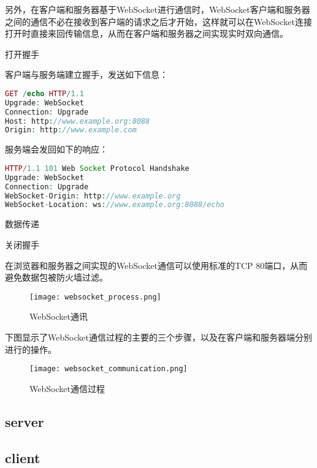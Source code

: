 另外，在客户端和服务器基于WebSocket进行通信时，WebSocket客户端和服务器之间的通信不必在接收到客户端的请求之后才开始，这样就可以在WebSocket连接打开时直接来回传输信息，从而在客户端和服务器之间实现实时双向通信。

\begin{compactenum}
\item 打开握手


客户端与服务端建立握手，发送如下信息：

\begin{lstlisting}[language=PHP]
GET /echo HTTP/1.1
Upgrade: WebSocket
Connection: Upgrade
Host: http://www.example.org:8088
Origin: http://www.example.com
\end{lstlisting}

服务端会发回如下的响应：

\begin{lstlisting}[language=PHP]
HTTP/1.1 101 Web Socket Protocol Handshake
Upgrade: WebSocket
Connection: Upgrade
WebSocket-Origin: http://www.example.org
WebSocket-Location: ws://www.example.org:8088/echo
\end{lstlisting}

\item 数据传递
\item 关闭握手
\end{compactenum}



在浏览器和服务器之间实现的WebSocket通信可以使用标准的TCP 80端口，从而避免数据包被防火墙过滤。

\begin{figure}[htbp]
\centering
\texttt{[image: websocket\_process.png]}
\caption{WebSocket通讯}
\end{figure}

下图显示了WebSocket通信过程的主要的三个步骤，以及在客户端和服务器端分别进行的操作。

\begin{figure}[htbp]
\centering
\texttt{[image: websocket\_communication.png]}
\caption{WebSocket通信过程}
\end{figure}





\subsection{server}





\subsection{client}

